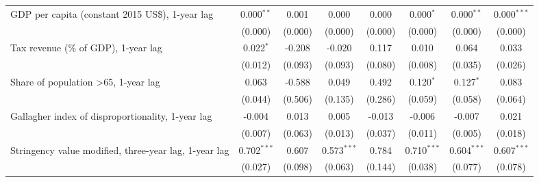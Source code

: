 \begin{table}[htbp]
\begin{tabular}{lccccccc}
      GDP per capita (constant 2015 US\$), 1-year lag                                          & 0.000$^{**}$   & 0.001                     & 0.000          & 0.000            & 0.000$^{*}$     & 0.000$^{**}$    & 0.000$^{***}$\\   
                                                                                               & (0.000)        & (0.000)                   & (0.000)        & (0.000)          & (0.000)         & (0.000)         & (0.000)\\   
      Tax revenue (\% of GDP), 1-year lag                                                      & 0.022$^{*}$    & -0.208                    & -0.020         & 0.117            & 0.010           & 0.064           & 0.033\\   
                                                                                               & (0.012)        & (0.093)                   & (0.093)        & (0.080)          & (0.008)         & (0.035)         & (0.026)\\   
      Share of population >65, 1-year lag                                                      & 0.063          & -0.588                    & 0.049          & 0.492            & 0.120$^{*}$     & 0.127$^{*}$     & 0.083\\   
                                                                                               & (0.044)        & (0.506)                   & (0.135)        & (0.286)          & (0.059)         & (0.058)         & (0.064)\\   
      Gallagher index of disproportionality, 1-year lag                                        & -0.004         & 0.013                     & 0.005          & -0.013           & -0.006          & -0.007          & 0.021\\   
                                                                                               & (0.007)        & (0.063)                   & (0.013)        & (0.037)          & (0.011)         & (0.005)         & (0.018)\\   
      Stringency value modified, three-year lag, 1-year lag                                    & 0.702$^{***}$  & 0.607                     & 0.573$^{***}$  & 0.784            & 0.710$^{***}$   & 0.604$^{***}$   & 0.607$^{***}$\\   
                                                                                               & (0.027)        & (0.098)                   & (0.063)        & (0.144)          & (0.038)         & (0.077)         & (0.078)\\   

\end{tabular}
\end{table}
